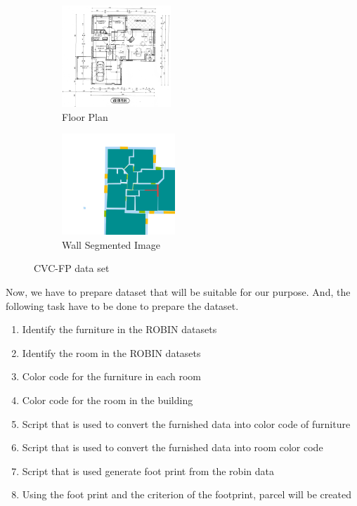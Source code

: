                 \begin{figure}[h]
                        \centering
                        \begin{subfigure}{.5\textwidth}
                                \centering
                                \includegraphics[height=1.5in]{img/chapter_6/2.png}
                                \caption{Floor Plan}
                                \label{fig:Floor Plan}
                        \end{subfigure}
                        \begin{subfigure}{.4\textwidth}
                                \centering
                                \includegraphics[height=1.5in]{img/chapter_6/2_gt_16.jpg}
                                \caption{Wall Segmented Image}
                                \label{fig:Wall Segmented Image}
                        \end{subfigure}
                        \caption{CVC-FP data set}
                        \label{fig:CVC-FP data set}
                \end{figure}
                Now, we have to prepare dataset that will be suitable for our purpose. And, the following task have to be done to prepare the dataset. 
                \begin{enumerate}[label=\alph*.]
                        \item Identify the furniture in the ROBIN datasets
                        \item Identify the room in the ROBIN datasets
                        \item Color code for the furniture in each room
                        \item Color code for the room in the building
                        \item Script that is used to convert the furnished data into color code of furniture
                        \item Script that is used to convert the furnished data into room color code
                        \item Script that is used generate foot print from the robin data
                        \item Using the foot print and the criterion of the footprint, parcel will be created
                \end{enumerate}
                \pagebreak

